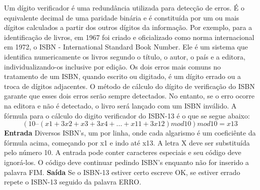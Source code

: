 \documentclass[a4paper, 12pt]{article}
\begin{document}
Um dígito verificador é uma redundância utilizada para detecção de erros. É o equivalente decimal de uma paridade binária e é constituída por um ou mais dígitos calculados a partir dos outros dígitos da informação. Por exemplo, para a identificação de livros, em 1967 foi criado e oficializado como norma internacional em 1972, o ISBN - International Standard Book Number. Ele é um sistema que identifica numericamente os livros segundo o título, o autor, o país e a editora, individualizando-os inclusive por edição.
Os dois erros mais comuns no tratamento de um ISBN, quando escrito ou digitado, é um dígito errado ou a troca de dígitos adjacentes. O método de cálculo do dígito de verificação do ISBN garante que esses dois erros serão sempre detectados. No entanto, se o erro ocorre na editora e não é detectado, o livro será lançado com um ISBN inválido.
A fórmula para o cálculo do digito verificador do ISBN-13 é o que se segue abaixo:\newline
$$(10 – (x1 + 3x2 + x3 + 3x4 + ... +x11 + 3x12) mod 10) mod 10 = x13$$
\newline \newline
\textbf{{\large Entrada}} \newline
Diversos ISBN's, um por linha, onde cada algarismo é um coeficiênte da fórmula acima, começando por x1 e indo até x13. 
\newline
A letra X deve ser substituída pelo número 10. 
\newline
A entrada pode conter caracteres especiais e seu código deve ignorá-los.
\newline
O código deve continuar pedindo ISBN's enquanto não for inserido a palavra FIM.
\newline \newline
\textbf{{\large Saída}} \newline
Se o ISBN-13 estiver certo escreve OK, se estiver errado repete o ISBN-13 seguido da palavra ERRO.\newline
\newline \newline
\newline
\end{document}
